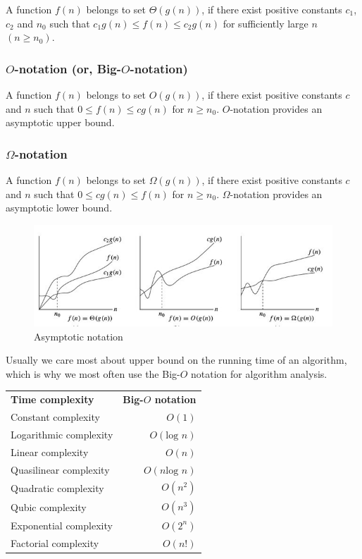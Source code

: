 \documentclass[a4paper,11pt]{book}
\begin{document}
A function $f(n)$ belongs to set $\Theta\left(g(n)\right)$, if there exist positive constants $c_1$, $c_2$ and $n_0$ such that $c_1g(n) \leq f(n) \leq c_2g(n)$ for sufficiently large $n$ $(n \geq n_0)$.

\subsubsection{$O$-notation (or, Big-$O$-notation)}
A function $f(n)$ belongs to set $O\left(g(n)\right)$, if there exist positive constants $c$ and $n$ such that $0 \leq f(n) \leq cg(n)$ for $n \geq n_0$. $O$-notation provides an asymptotic upper bound.

\subsubsection{$\Omega$-notation}
A function $f(n)$ belongs to set $\Omega\left(g(n)\right)$, if there exist positive constants $c$ and $n$ such that $0 \leq cg(n) \leq f(n)$ for $n \geq n_0$. $\Omega$-notation provides an asymptotic lower bound.

\begin{figure}[ht]
	\centering
	\includegraphics[scale=0.5]{pic/time.jpg}
	\caption{Asymptotic notation}
\end{figure}

\noindent Usually we care most about upper bound on the running time of an algorithm, which is why we most often use the Big-$O$ notation for algorithm analysis.

\begin{table}[ht]
\centering
\begin{tabular}{lr}
\textbf{Time complexity}        & \textbf{Big-$O$ notation}    \\
Constant complexity    & $O(1)$              \\
Logarithmic complexity & $O(\text{log } n)$   \\
Linear complexity      & $O(n)$              \\
Quasilinear complexity & $O(n \text{log } n)$ \\
Quadratic complexity   & $O(n^2)$            \\
Qubic complexity       & $O(n^3)$            \\
Exponential complexity & $O(2^n)$            \\
Factorial complexity   & $O(n!)$            
\end{tabular}
\end{table}
\end{document}
